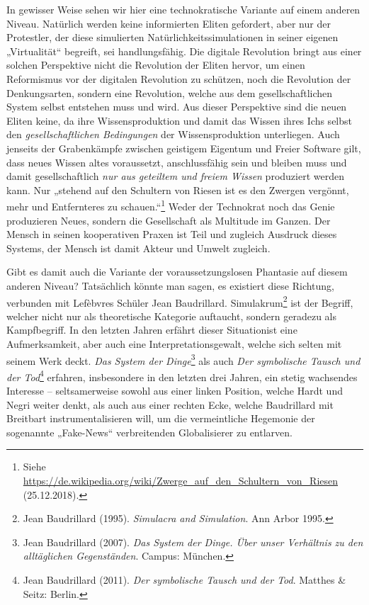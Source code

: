 \documentclass[a4paper,11pt]{article}
\begin{document}
In gewisser Weise sehen wir hier eine technokratische Variante auf einem
anderen Niveau.  Natürlich werden keine informierten Eliten gefordert, aber
nur der Protestler, der diese simulierten Natürlichkeitssimulationen in seiner
eigenen „Virtualität“ begreift, sei handlungsfähig.  Die digitale Revolution
bringt aus einer solchen Perspektive nicht die Revolution der Eliten hervor,
um einen Reformismus vor der digitalen Revolution zu schützen, noch die
Revolution der Denkungsarten, sondern eine Revolution, welche aus dem
gesellschaftlichen System selbst entstehen muss und wird.  Aus dieser
Perspektive sind die neuen Eliten keine, da ihre Wissensproduktion und damit
das Wissen ihres Ichs selbst den \emph{gesellschaftlichen Bedingungen} der
Wissensproduktion unterliegen.  Auch jenseits der Grabenkämpfe zwischen
geistigem Eigentum und Freier Software gilt, dass neues Wissen altes
voraussetzt, anschlussfähig sein und bleiben muss und damit gesellschaftlich
\emph{nur aus geteiltem und freiem Wissen} produziert werden kann. Nur
„stehend auf den Schultern von Riesen ist es den Zwergen vergönnt, mehr und
Entfernteres zu schauen.“\footnote{Siehe
  \url{https://de.wikipedia.org/wiki/Zwerge_auf_den_Schultern_von_Riesen}
  (25.12.2018).}  Weder der Technokrat noch das Genie produzieren Neues,
sondern die Gesellschaft als Multitude im Ganzen. Der Mensch in seinen
kooperativen Praxen ist Teil und zugleich Ausdruck dieses Systems, der Mensch
ist damit Akteur und Umwelt zugleich.

Gibt es damit auch die Variante der voraussetzungslosen Phantasie auf diesem
anderen Niveau?  Tatsächlich könnte man sagen, es existiert diese Richtung,
verbunden mit Lefèbvres Schüler Jean Baudrillard. Simulakrum\footnote{Jean
  Baudrillard (1995). \emph{Simulacra and Simulation}. Ann Arbor 1995.} ist
der Begriff, welcher nicht nur als theoretische Kategorie auftaucht, sondern
geradezu als Kampfbegriff. In den letzten Jahren erfährt dieser Situationist
eine Aufmerksamkeit, aber auch eine Interpretationsgewalt, welche sich selten
mit seinem Werk deckt.  \emph{Das System der Dinge}\footnote{Jean Baudrillard
  (2007). \emph{Das System der Dinge. Über unser Verhältnis zu den
    alltäglichen Gegenständen}. Campus: München.} als auch \emph{Der
  symbolische Tausch und der Tod}\footnote{Jean Baudrillard (2011). \emph{Der
    symbolische Tausch und der Tod}. Matthes \& Seitz: Berlin.} erfahren,
insbesondere in den letzten drei Jahren, ein stetig wachsendes Interesse --
seltsamerweise sowohl aus einer linken Position, welche Hardt und Negri weiter
denkt, als auch aus einer rechten Ecke, welche Baudrillard mit Breitbart 
instrumentalisieren will, um die vermeintliche Hegemonie der sogenannte
„Fake-News“ verbreitenden Globalisierer zu entlarven.
\end{document}
